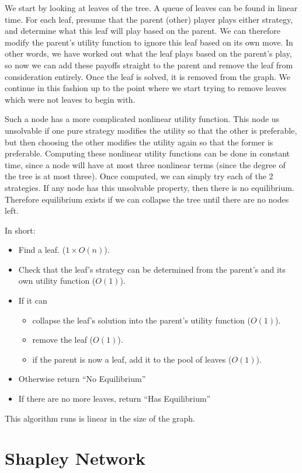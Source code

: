 \documentclass{article}
\begin{document}
We start by looking at leaves of the tree.
A queue of leaves can be found in linear time.
For each leaf, presume that the parent (other) player plays either strategy, and determine what this leaf will play based on the parent.
We can therefore modify the parent's utility function to ignore this leaf based on its own move.
In other words, we have worked out what the leaf plays based on the parent's play, so now we can add these payoffs straight to the parent and remove the leaf from consideration entirely.
Once the leaf is solved, it is removed from the graph.
We continue in this fashion up to the point where we start trying to remove leaves which were not leaves to begin with.

Such a node has a more complicated nonlinear utility function.
This node us unsolvable if one pure strategy modifies the utility so that the other is preferable, but then choosing the other modifies the utility again so that the former is preferable.
Computing these nonlinear utility functions can be done in constant time, since a node will have at most three nonlinear terms (since the degree of the tree is at most three).
Once computed, we can simply try each of the 2 strategies.
If any node has this unsolvable property, then there is no equilibrium.
Therefore equilibrium exists if we can collapse the tree until there are no nodes left.

In short:
\begin{itemize}
	\item Find a leaf. ($1 \times O(n)$).
	\item Check that the leaf's strategy can be determined from the parent's and its own utility function ($O(1)$).
	\item If it can
	\begin{itemize}
		\item collapse the leaf's solution into the parent's utility function ($O(1)$).
		\item remove the leaf ($O(1)$).
		\item if the parent is now a leaf, add it to the pool of leaves ($O(1)$).
	\end{itemize}
	\item Otherwise return ``No Equilibrium''
	\item If there are no more leaves, return ``Has Equilibrium''
\end{itemize}
This algorithm runs is linear in the size of the graph.

\section {Shapley Network}
\end{document}
